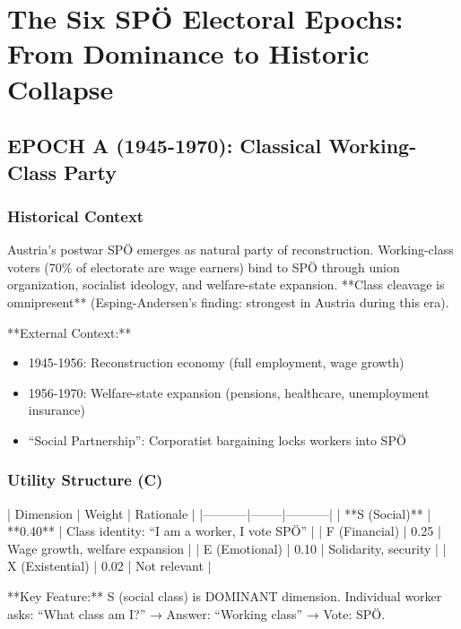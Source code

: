 \clearpage


\section{The Six SPÖ Electoral Epochs: From Dominance to Historic Collapse}
\label{sec:spo-epochs}

\subsection{EPOCH A (1945-1970): Classical Working-Class Party}

\subsubsection{Historical Context}

Austria's postwar SPÖ emerges as natural party of reconstruction. Working-class voters (70\% of electorate are wage earners) bind to SPÖ through union organization, socialist ideology, and welfare-state expansion. **Class cleavage is omnipresent** (Esping-Andersen's finding: strongest in Austria during this era).

**External Context:**
\begin{itemize}
\item 1945-1956: Reconstruction economy (full employment, wage growth)
\item 1956-1970: Welfare-state expansion (pensions, healthcare, unemployment insurance)
\item ``Social Partnership'': Corporatist bargaining locks workers into SPÖ
\end{itemize}

\subsubsection{Utility Structure (C)}

| Dimension | Weight | Rationale |
|-----------|--------|-----------|
| **S (Social)** | **0.40** | Class identity: ``I am a worker, I vote SPÖ'' |
| F (Financial) | 0.25 | Wage growth, welfare expansion |
| E (Emotional) | 0.10 | Solidarity, security |
| X (Existential) | 0.02 | Not relevant |

**Key Feature:** S (social class) is DOMINANT dimension. Individual worker asks: ``What class am I?'' → Answer: ``Working class'' → Vote: SPÖ.

